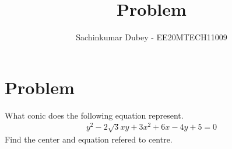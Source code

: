 \documentclass[journal,12pt,twocolumn]{IEEEtran}
\begin{document}
\def\putbox#1#2#3{\makebox[0in][l]{\makebox[#1][l]{}\raisebox{\baselineskip}[0in][0in]{\raisebox{#2}[0in][0in]{#3}}}}
     \def\rightbox#1{\makebox[0in][r]{#1}}
     \def\centbox#1{\makebox[0in]{#1}}
     \def\topbox#1{\raisebox{-\baselineskip}[0in][0in]{#1}}
     \def\midbox#1{\raisebox{-0.5\baselineskip}[0in][0in]{#1}}
\vspace{3cm}
\title{Problem}
\author{Sachinkumar Dubey - EE20MTECH11009}
\maketitle
\newpage
\bigskip

\section{Problem}
What conic does the following equation represent.
\begin{align}
y^2-2\sqrt{3}xy+3x^2+6x-4y+5=0
\end{align}
Find the center and equation refered to centre.
\end{document}
